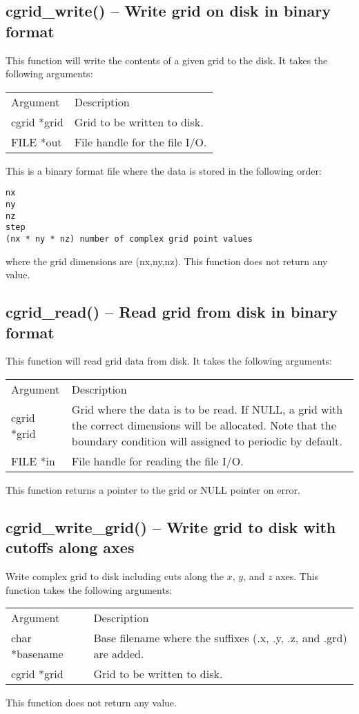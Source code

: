 \documentclass[12pt,letterpaper]{report}
\begin{document}
\subsection{cgrid\_write() -- Write grid on disk in binary format}

This function will write the contents of a given grid to the disk. It takes the following arguments:
\begin{longtable}{p{} p{}}
Argument & Description\\
\cline{1-2}
cgrid *grid & Grid to be written to disk.\\
FILE *out & File handle for the file I/O.\\
\end{longtable}
\noindent
This is a binary format file where the data is stored in the following order:
\begin{verbatim}
nx
ny
nz
step
(nx * ny * nz) number of complex grid point values
\end{verbatim}
where the grid dimensions are (nx,ny,nz). This function does not return any value.

\subsection{cgrid\_read() -- Read grid from disk in binary format}

This function will read grid data from disk. It takes the following arguments:
\begin{longtable}{p{} p{}}
Argument & Description\\
\cline{1-2}
cgrid *grid & Grid where the data is to be read. If NULL, a grid with the correct dimensions will be allocated. Note that the boundary condition will assigned to periodic by default.\\
FILE *in & File handle for reading the file I/O.\\
\end{longtable}
This function returns a pointer to the grid or NULL pointer on error.

\subsection{cgrid\_write\_grid() -- Write grid to disk with cutoffs along axes}

Write complex grid to disk including cuts along the $x$, $y$, and $z$ axes. This function takes the following arguments:
\begin{longtable}{p{} p{}}
Argument & Description\\
\cline{1-2}
char *basename & Base filename where the suffixes (.x, .y, .z, and .grd) are added.\\
cgrid *grid & Grid to be written to disk.\\
\end{longtable}
\noindent
This function does not return any value.
\end{document}
